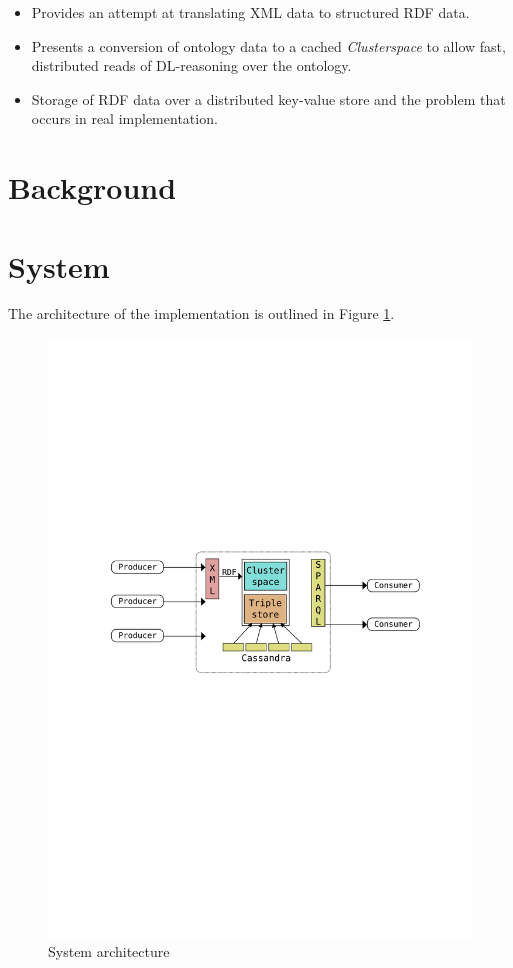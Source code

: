 \documentclass[journal]{IEEEtran}
\begin{document}
\begin{itemize}
    \item Provides an attempt at translating XML data to structured RDF data.
    \item Presents a conversion of ontology data to a cached \emph{Clusterspace} to
        allow fast, distributed reads of DL-reasoning over the ontology.
    \item Storage of RDF data over a distributed key-value store and the
        problem that occurs in real implementation.
\end{itemize}

\section{Background}
\label{sec:background}

\section{System}
The architecture of the implementation is outlined in Figure \ref{fig:architecture}.

\begin{figure}
    \centering
    \includegraphics[scale=0.5]{images/architecture}
    \caption{System architecture}
    \label{fig:architecture}
\end{figure}
\end{document}
